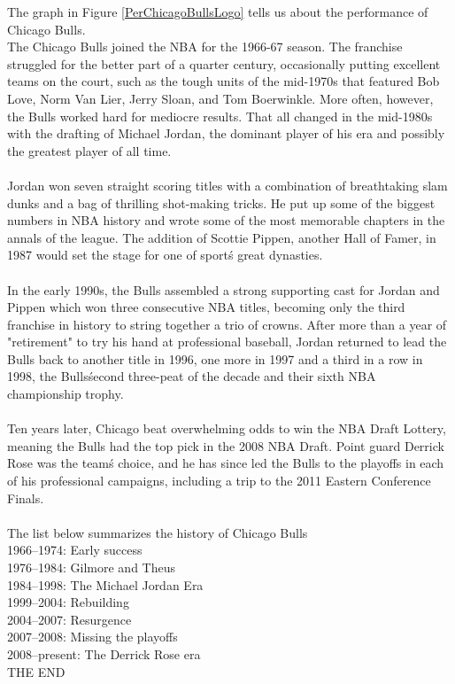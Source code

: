 \documentclass[a4paper]{article}
\begin{document}
The graph in Figure \ref{PerChicagoBullsLogo} tells us about the performance of Chicago Bulls.\\
The Chicago Bulls joined the NBA for the 1966-67 season. The franchise struggled for the better part of a quarter century, occasionally putting excellent teams on the court, such as the tough units of the mid-1970s that featured Bob Love, Norm Van Lier, Jerry Sloan, and Tom Boerwinkle. More often, however, the Bulls worked hard for mediocre results. That all changed in the mid-1980s with the drafting of Michael Jordan, the dominant player of his era and possibly the greatest player of all time.\\
\\
Jordan won seven straight scoring titles with a combination of breathtaking slam dunks and a bag of thrilling shot-making tricks. He put up some of the biggest numbers in NBA history and wrote some of the most memorable chapters in the annals of the league. The addition of Scottie Pippen, another Hall of Famer, in 1987 would set the stage for one of sport\'s great dynasties.\\
\\
In the early 1990s, the Bulls assembled a strong supporting cast for Jordan and Pippen which won three consecutive NBA titles, becoming only the third franchise in history to string together a trio of crowns. After more than a year of "retirement" to try his hand at professional baseball, Jordan returned to lead the Bulls back to another title in 1996, one more in 1997 and a third in a row in 1998, the Bulls\'  second three-peat of the decade and their sixth NBA championship trophy.\\
\\
Ten years later, Chicago beat overwhelming odds to win the NBA Draft Lottery, meaning the Bulls had the top pick in the 2008 NBA Draft. Point guard Derrick Rose was the team\'s choice, and he has since led the Bulls to the playoffs in each of his professional campaigns, including a trip to the 2011 Eastern Conference Finals.\\
\\
The list below summarizes the history of Chicago Bulls\\
1966--1974: Early success\\
1976--1984: Gilmore and Theus\\
1984--1998: The Michael Jordan Era\\
1999--2004: Rebuilding\\
2004--2007: Resurgence\\
2007--2008: Missing the playoffs\\
2008--present: The Derrick Rose era\\

\centering
 THE END 
\end{document}
